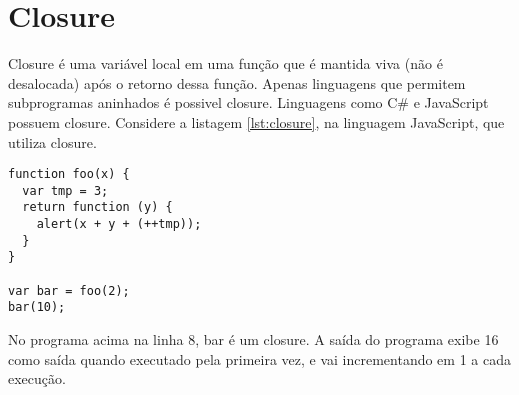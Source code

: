 \section{Closure}
\label{sec:closure}
Closure é uma variável local em uma função que é mantida viva (não é desalocada) após o retorno dessa função. Apenas linguagens que permitem subprogramas aninhados é possivel closure. Linguagens como C\# e JavaScript possuem closure. Considere a listagem \ref{lst:closure}, na linguagem JavaScript, que utiliza closure.

\begin{lstlisting}[caption={Closure em JavaScript}, label={lst:closure}]
function foo(x) {
  var tmp = 3;
  return function (y) {
    alert(x + y + (++tmp));
  }
}

var bar = foo(2);
bar(10); 
\end{lstlisting}

\noindent
No programa acima na linha 8, bar é um closure. A saída do programa exibe 16 como saída quando executado pela primeira vez, e vai incrementando em 1 a cada execução.